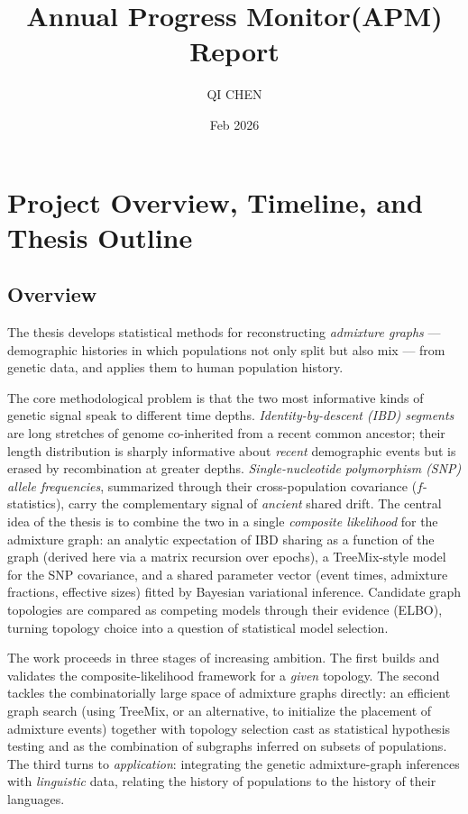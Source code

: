 \documentclass[12pt]{article}
\title{Annual Progress Monitor(APM) Report}
\author{QI CHEN}
\date{Feb 2026}
\theoremstyle{definition}
\theoremstyle{definition}
\theoremstyle{lemma}
\theoremstyle{remark}
\theoremstyle{definition}
\begin{document}
\maketitle

\setcounter{section}{-1}
\section{Project Overview, Timeline, and Thesis Outline}\label{sec:overview}

\subsection{Overview}
The thesis develops statistical methods for reconstructing \emph{admixture
graphs} --- demographic histories in which populations not only split but also
mix --- from genetic data, and applies them to human population history.

The core methodological problem is that the two most informative kinds of genetic
signal speak to different time depths. \emph{Identity-by-descent (IBD) segments}
are long stretches of genome co-inherited from a recent common ancestor; their
length distribution is sharply informative about \emph{recent} demographic events
but is erased by recombination at greater depths. \emph{Single-nucleotide
polymorphism (SNP) allele frequencies}, summarized through their cross-population
covariance ($f$-statistics), carry the complementary signal of \emph{ancient}
shared drift. The central idea of the thesis is to combine the two in a single
\emph{composite likelihood} for the admixture graph: an analytic expectation of
IBD sharing as a function of the graph (derived here via a matrix recursion over
epochs), a TreeMix-style model for the SNP covariance, and a shared parameter
vector (event times, admixture fractions, effective sizes) fitted by Bayesian
variational inference. Candidate graph topologies are compared as competing
models through their evidence (ELBO), turning topology choice into a question of
statistical model selection.

The work proceeds in three stages of increasing ambition. The first builds and
validates the composite-likelihood framework for a \emph{given} topology. The
second tackles the combinatorially large space of admixture graphs directly: an
efficient graph search (using TreeMix, or an alternative, to initialize the
placement of admixture events) together with topology selection cast as
statistical hypothesis testing and as the combination of subgraphs inferred on
subsets of populations. The third turns to \emph{application}: integrating the
genetic admixture-graph inferences with \emph{linguistic} data, relating the
history of populations to the history of their languages.
\end{document}
